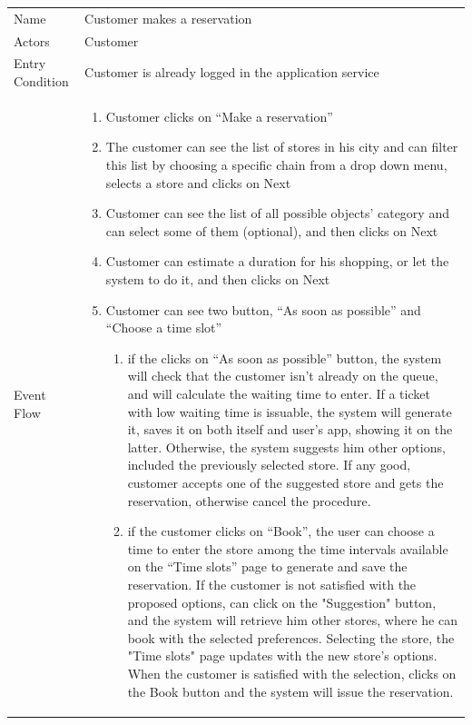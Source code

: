 \documentclass{article}
\newcommand\xrowht[2][0]
{\addstackgap[.5\dimexpr#2\relax]{\vphantom{#1}}}
\begin{document}
				\begin{center}
					
					
					\begin{adjustwidth}{-2.8cm}{}
					\begin{tabular}[h!]{|m{7.5em}|m{36em}|}
						
						\hline
						\xrowht{5pt}
						Name & Customer makes a reservation\\
						\xrowht{5pt}
						Actors & Customer\\
						\xrowht{5pt}
						Entry Condition & Customer is already logged in the application service\\
						\xrowht{5pt}
						Event Flow & \begin{enumerate}
							
							\itemsep-0.25em
							\item Customer clicks on “Make a reservation”
							\item The customer can see the list of stores in his city and can filter this list by choosing a specific chain from a drop down menu, selects a store and clicks on Next
							\item Customer can see the list of all possible objects’ category and can select some of them (optional), and then clicks on Next
							\item Customer can estimate a duration for his shopping, or let the system to do it, and then clicks on Next
							\item Customer can see two button, “As soon as possible” and “Choose a time slot”
							 
							\begin{enumerate}
								
								\itemsep-0.25em
								\item if the clicks on “As soon as possible” button, the system will check that the customer isn't already on the queue, and will calculate the waiting time to enter. If a ticket with low waiting time is issuable, the system will generate it, saves it on both itself and user's app, showing it on the latter.
									 Otherwise, the system suggests him other options, included the previously selected store. If any good, customer accepts one of the suggested store and gets the reservation, otherwise cancel the procedure.
									 \medskip	

								
								\item if the customer clicks on “Book”, the user can choose a time to enter the store among the time intervals available on the “Time slots” page to generate and save the reservation. If the customer is not satisfied with the proposed options, can click on the "Suggestion" button, and the system will retrieve him other stores, where he can book with the selected preferences. Selecting the store, the "Time slots" page updates with the new store's options. When the customer is satisfied with the selection, clicks on the Book button and the system will issue the reservation.
								

\end{enumerate}
\end{enumerate}
\end{tabular}
\end{adjustwidth}
\end{center}
\end{document}
